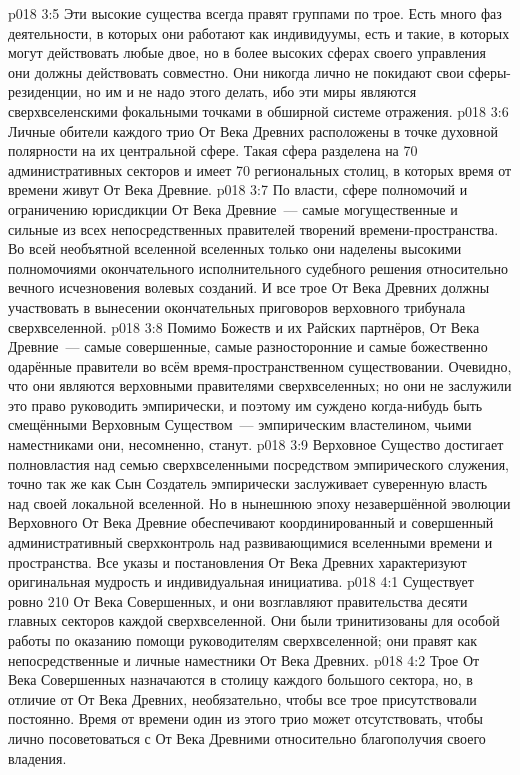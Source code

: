 \vs p018 3:5 \pc Эти высокие существа всегда правят группами по трое. Есть много фаз деятельности, в которых они работают как индивидуумы, есть и такие, в которых могут действовать любые двое, но в более высоких сферах своего управления они должны действовать совместно. Они никогда лично не покидают свои сферы\hyp{}резиденции, но им и не надо этого делать, ибо эти миры являются сверхвселенскими фокальными точками в обширной системе отражения.
\vs p018 3:6 Личные обители каждого трио От Века Древних расположены в точке духовной полярности на их центральной сфере. Такая сфера разделена на 70 административных секторов и имеет 70 региональных столиц, в которых время от времени живут От Века Древние.
\vs p018 3:7 По власти, сфере полномочий и ограничению юрисдикции От Века Древние~--- самые могущественные и сильные из всех непосредственных правителей творений времени\hyp{}пространства. Во всей необъятной вселенной вселенных только они наделены высокими полномочиями окончательного исполнительного судебного решения относительно вечного исчезновения волевых созданий. И все трое От Века Древних должны участвовать в вынесении окончательных приговоров верховного трибунала сверхвселенной.
\vs p018 3:8 \pc Помимо Божеств и их Райских партнёров, От Века Древние~--- самые совершенные, самые разносторонние и самые божественно одарённые правители во всём время\hyp{}пространственном существовании. Очевидно, что они являются верховными правителями сверхвселенных; но они не заслужили это право руководить эмпирически, и поэтому им суждено когда\hyp{}нибудь быть смещёнными Верховным Существом~--- эмпирическим властелином, чьими наместниками они, несомненно, станут.
\vs p018 3:9 Верховное Существо достигает полновластия над семью сверхвселенными посредством эмпирического служения, точно так же как Сын Создатель эмпирически заслуживает суверенную власть над своей локальной вселенной. Но в нынешнюю эпоху незавершённой эволюции Верховного От Века Древние обеспечивают координированный и совершенный административный сверхконтроль над развивающимися вселенными времени и пространства. Все указы и постановления От Века Древних характеризуют оригинальная мудрость и индивидуальная инициатива.
\vs p018 4:1 Существует ровно 210 От Века Совершенных, и они возглавляют правительства десяти главных секторов каждой сверхвселенной. Они были тринитизованы для особой работы по оказанию помощи руководителям сверхвселенной; они правят как непосредственные и личные наместники От Века Древних.
\vs p018 4:2 Трое От Века Совершенных назначаются в столицу каждого большого сектора, но, в отличие от От Века Древних, необязательно, чтобы все трое присутствовали постоянно. Время от времени один из этого трио может отсутствовать, чтобы лично посоветоваться с От Века Древними относительно благополучия своего владения.
